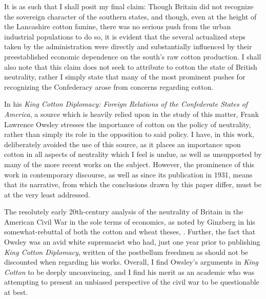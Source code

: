 It is as such that I shall posit my final claim: Though Britain did not recognize the sovereign character of the southern states, and though, 
even at the height of the Lancashire cotton famine, there was no serious push from the urban industrial populations to do so, it is evident that the several actualized
steps taken by the administration were directly and substantially influenced by their preestablished economic dependence on the south's raw cotton production. I shall
also note that this claim does not seek to attribute to cotton the state of British neutrality, rather I simply state that many of the most prominent pushes for
recognizing the Confederacy arose from concerns regarding cotton.

\hfill

In his \textit{King Cotton Diplomacy: Foreign Relations of the Confederate States of America}, a source which is heavily relied upon in the study of this matter,
Frank Lawrence Owsley stresses the importance of cotton on the policy of neutrality, rather than simply its role in the opposition to said policy. I have, in this work,
deliberately avoided the use of this source, as it places an importance upon cotton in all aspects of neutrality which I feel is undue, as well as unsupported by
many of the more recent works on the subject. However, the prominence of this work in contemporary discourse, as well as since its publication in 1931, means that
its narrative, from which the conclusions drawn by this paper differ, must be at the very least addressed.

The resolutely early 20th-century analysis of the neutrality of Britain in the American Civil War in the sole terms of economics, as noted by Ginzberg in his
somewhat-rebuttal of both the cotton and wheat theses,  \Autocite{ginzbergeconomicsbritish1936}. Further, the fact that Owsley was an avid white supremacist who had, just one year prior to publishing
\textit{King Cotton Diplomacy}, written of the postbellum freedmen as \Autocite[62]{owsleyIrrepressibleConflict1930} should not be discounted
when regarding his works. Overall, I find Owsley's arguments in \textit{King Cotton} to be deeply unconvincing, and I find his merit as an academic who was attempting to
present an unbiased perspective of the civil war to be questionable at best.